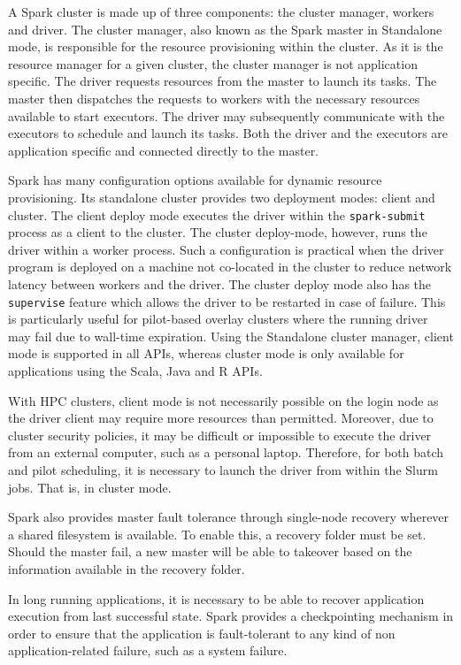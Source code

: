 	A Spark cluster is made up of three components: the cluster manager, workers and
	driver. The cluster manager, also known as the Spark master in Standalone mode, is responsible for the
	resource provisioning within the cluster.  As it is the resource manager for a given cluster,
	the cluster manager is not application specific. The driver requests resources from the master
	to launch its tasks. The master then dispatches the requests to workers with
	the necessary resources available to start
	executors. The driver may subsequently communicate with the executors to schedule and launch its tasks. Both the driver and
	the executors are application specific and connected directly to the master. 
    
	Spark has many configuration options available for dynamic resource provisioning.
	Its standalone cluster provides two deployment modes: client and cluster. The client
	deploy mode executes the driver within the \texttt{spark-submit} process as
	a client to the cluster. The cluster deploy-mode, however, runs the driver within
	a worker process. Such a configuration is practical when the driver program
	is deployed on a machine not co-located in the cluster to reduce network 
	latency between workers and the driver. The cluster deploy mode also has the \texttt{supervise}
	feature which allows the driver to be restarted in case of failure.
	This is particularly useful for
	pilot-based overlay clusters where the running driver may fail due to wall-time expiration.
	Using the Standalone cluster manager, client mode is supported in all APIs, whereas cluster mode is
	only available for applications using the Scala, Java and R APIs.
    
	With HPC clusters, client mode is not necessarily possible on the login node as the
	driver client may require more resources than permitted. Moreover, due to cluster
	security policies, it may be difficult or impossible to execute the driver from
	an external computer, such as a personal laptop. Therefore, for both batch and pilot
	scheduling, it is necessary to launch the driver from within the Slurm jobs. That is, in cluster mode.
    
	Spark also provides master fault tolerance through single-node recovery wherever a shared
	filesystem is available. To enable this, a recovery folder must be set. Should the master
	fail, a new master will be able to takeover based on the information available in the recovery
	folder.
    
	In long running applications, it is necessary to be able to recover application execution from
	last successful state. Spark provides a checkpointing mechanism in order to ensure that the application
	is fault-tolerant to any kind of non application-related failure, such as a system failure.
    
